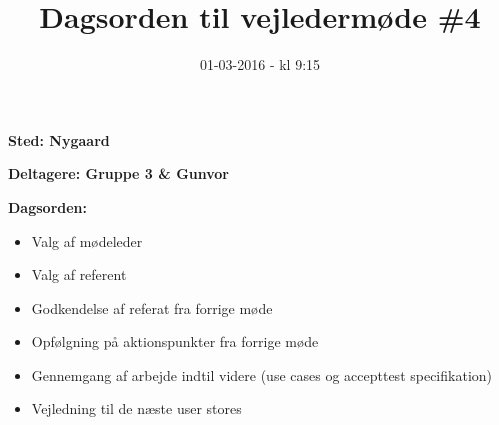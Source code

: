 \documentclass{article}
\title{Dagsorden til vejledermøde \#4}
\date{01-03-2016 - kl 9:15}
\begin{document}
	\maketitle

	\textbf{Sted: Nygaard}
	
	\textbf{Deltagere: Gruppe 3 \& Gunvor}
	
	\textbf{Dagsorden:}
	\begin{itemize}
		\item Valg af mødeleder
		\item Valg af referent
		\item Godkendelse af referat fra forrige møde 
		\item Opfølgning på aktionspunkter fra forrige møde
		\item Gennemgang af arbejde indtil videre (use cases og accepttest specifikation)
		\item Vejledning til de næste user stores
	\end{itemize}
\end{document}
